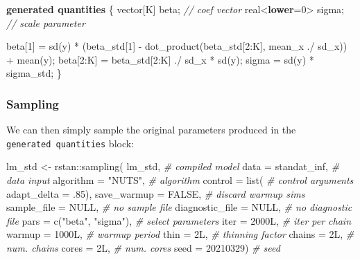 \documentclass[
  11pt,
]{article}
\newenvironment{Shaded}{\begin{snugshade}}{\end{snugshade}}
\newcommand{\AttributeTok}[1]{\textcolor[rgb]{0.77,0.63,0.00}{#1}}
\newcommand{\CommentTok}[1]{\textcolor[rgb]{0.56,0.35,0.01}{\textit{#1}}}
\newcommand{\ConstantTok}[1]{\textcolor[rgb]{0.00,0.00,0.00}{#1}}
\newcommand{\DataTypeTok}[1]{\textcolor[rgb]{0.13,0.29,0.53}{#1}}
\newcommand{\DecValTok}[1]{\textcolor[rgb]{0.00,0.00,0.81}{#1}}
\newcommand{\FunctionTok}[1]{\textcolor[rgb]{0.00,0.00,0.00}{#1}}
\newcommand{\KeywordTok}[1]{\textcolor[rgb]{0.13,0.29,0.53}{\textbf{#1}}}
\newcommand{\NormalTok}[1]{#1}
\newcommand{\OtherTok}[1]{\textcolor[rgb]{0.56,0.35,0.01}{#1}}
\newcommand{\SpecialCharTok}[1]{\textcolor[rgb]{0.00,0.00,0.00}{#1}}
\newcommand{\StringTok}[1]{\textcolor[rgb]{0.31,0.60,0.02}{#1}}
\begin{document}
\begin{Shaded}
\begin{Highlighting}[]
\KeywordTok{generated quantities}\NormalTok{ \{}
  \DataTypeTok{vector}\NormalTok{[K] beta;          }\CommentTok{// coef vector}
  \DataTypeTok{real}\NormalTok{\textless{}}\KeywordTok{lower}\NormalTok{=}\DecValTok{0}\NormalTok{\textgreater{} sigma;     }\CommentTok{// scale parameter}
  
\NormalTok{  beta[}\DecValTok{1}\NormalTok{] = sd(y) * (beta\_std[}\DecValTok{1}\NormalTok{] {-} }
\NormalTok{    dot\_product(beta\_std[}\DecValTok{2}\NormalTok{:K], mean\_x ./ sd\_x)) + mean(y);}
\NormalTok{  beta[}\DecValTok{2}\NormalTok{:K] = beta\_std[}\DecValTok{2}\NormalTok{:K] ./ sd\_x * sd(y);}
\NormalTok{  sigma = sd(y) * sigma\_std;}
\NormalTok{\}}
\end{Highlighting}
\end{Shaded}

\hypertarget{sampling}{%
\subsubsection{Sampling}\label{sampling}}

We can then simply sample the original parameters produced in the \texttt{generated\ quantities} block:

\begin{Shaded}
\begin{Highlighting}[]
\NormalTok{lm\_std }\OtherTok{\textless{}{-}}\NormalTok{ rstan}\SpecialCharTok{::}\FunctionTok{sampling}\NormalTok{(}
\NormalTok{  lm\_std,                     }\CommentTok{\# compiled model}
  \AttributeTok{data =}\NormalTok{ standat\_inf,         }\CommentTok{\# data input}
  \AttributeTok{algorithm =} \StringTok{"NUTS"}\NormalTok{,         }\CommentTok{\# algorithm}
  \AttributeTok{control =} \FunctionTok{list}\NormalTok{(             }\CommentTok{\# control arguments}
    \AttributeTok{adapt\_delta =}\NormalTok{ .}\DecValTok{85}\NormalTok{),}
  \AttributeTok{save\_warmup =} \ConstantTok{FALSE}\NormalTok{,        }\CommentTok{\# discard warmup sims}
  \AttributeTok{sample\_file =} \ConstantTok{NULL}\NormalTok{,         }\CommentTok{\# no sample file}
  \AttributeTok{diagnostic\_file =} \ConstantTok{NULL}\NormalTok{,     }\CommentTok{\# no diagnostic file}
  \AttributeTok{pars =} \FunctionTok{c}\NormalTok{(}\StringTok{"beta"}\NormalTok{, }\StringTok{"sigma"}\NormalTok{),  }\CommentTok{\# select parameters}
  \AttributeTok{iter =}\NormalTok{ 2000L,               }\CommentTok{\# iter per chain}
  \AttributeTok{warmup =}\NormalTok{ 1000L,             }\CommentTok{\# warmup period}
  \AttributeTok{thin =}\NormalTok{ 2L,                  }\CommentTok{\# thinning factor}
  \AttributeTok{chains =}\NormalTok{ 2L,                }\CommentTok{\# num. chains}
  \AttributeTok{cores =}\NormalTok{ 2L,                 }\CommentTok{\# num. cores}
  \AttributeTok{seed =} \DecValTok{20210329}\NormalTok{)            }\CommentTok{\# seed}
\end{Highlighting}
\end{Shaded}
\end{document}
